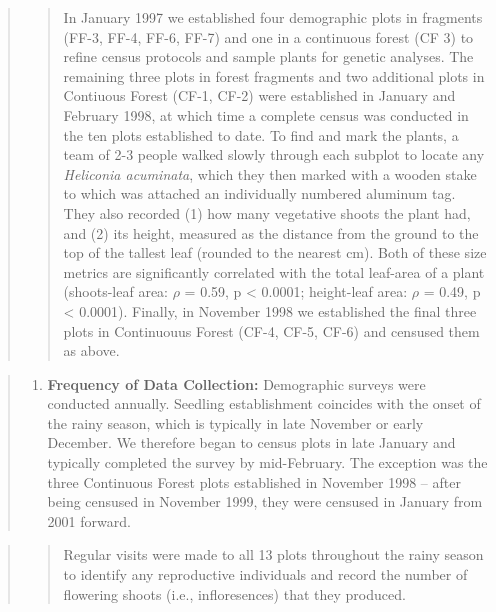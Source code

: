 \documentclass[
  man, donotrepeattitle,floatsintext]{apa6}
\providecommand{\tightlist}{%
  \setlength{\itemsep}{0pt}\setlength{\parskip}{0pt}}
\begin{document}
\begin{quote}
\begin{quote}
In January 1997 we established four demographic plots in fragments (FF-3, FF-4, FF-6, FF-7) and one in a continuous forest (CF 3) to refine census protocols and sample plants for genetic analyses. The remaining three plots in forest fragments and two additional plots in Contiuous Forest (CF-1, CF-2) were established in January and February 1998, at which time a complete census was conducted in the ten plots established to date. To find and mark the plants, a team of 2-3 people walked slowly through each subplot to locate any \emph{Heliconia acuminata}, which they then marked with a wooden stake to which was attached an individually numbered aluminum tag. They also recorded (1) how many vegetative shoots the plant had, and (2) its height, measured as the distance from the ground to the top of the tallest leaf (rounded to the nearest cm). Both of these size metrics are significantly correlated with the total leaf-area of a plant (shoots-leaf area: \(\rho\) = 0.59, p \textless{} 0.0001; height-leaf area: \(\rho\) = 0.49, p \textless{} 0.0001). Finally, in November 1998 we established the final three plots in Continuouus Forest (CF-4, CF-5, CF-6) and censused them as above.
\end{quote}
\end{quote}

\begin{quote}
\begin{enumerate}
\def\labelenumi{\alph{enumi}.}
\setcounter{enumi}{2}
\tightlist
\item
  \textbf{Frequency of Data Collection:} Demographic surveys were conducted annually. Seedling establishment coincides with the onset of the rainy season, which is typically in late November or early December. We therefore began to census plots in late January and typically completed the survey by mid-February. The exception was the three Continuous Forest plots established in November 1998 -- after being censused in November 1999, they were censused in January from 2001 forward.
\end{enumerate}
\end{quote}

\begin{quote}
\begin{quote}
Regular visits were made to all 13 plots throughout the rainy season to identify any reproductive individuals and record the number of flowering shoots (i.e., infloresences) that they produced.
\end{quote}
\end{quote}
\end{document}
